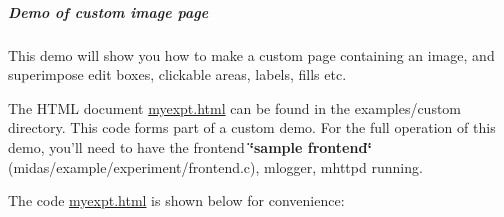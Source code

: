 \subparagraph{Demo of custom image page}\label{RC_mhttpd_custom_demo}
\par




\par


This demo will show you how to make a custom page containing an image, and superimpose edit boxes, clickable areas, labels, fills etc.

The HTML document \hyperlink{myexpt_8html}{myexpt.html} can be found in the examples/custom directory. This code forms part of a custom demo. For the full operation of this demo, you'll need to have the frontend {\bfseries \char`\"{}sample frontend\char`\"{}} (midas/example/experiment/frontend.c), mlogger, mhttpd running.

The code \hyperlink{myexpt_8html}{myexpt.html} is shown below for convenience: 
